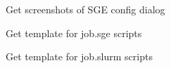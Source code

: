 
\begin{DoxyRefList}
\item[\label{todo__todo000001}%
\hypertarget{todo__todo000001}{}%
Page \hyperlink{tut-xo}{Xtal\+Opt Tutorial} ]Get screenshots of S\+G\+E config dialog

Get template for job.\+sge scripts

Get template for job.\+slurm scripts
\end{DoxyRefList}